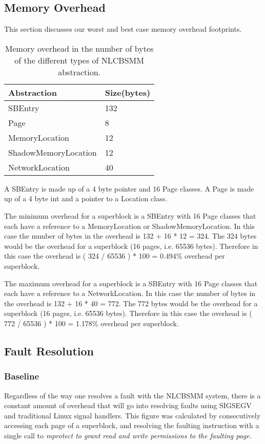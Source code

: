 \documentclass[9pt]{sig-alternate-10pt}
\begin{document}
\subsection{Memory Overhead}
This section discusses our worst and best case memory overhead footprints.

\begin{center}
\begin{table}[htb]
\begin{tabular}{|l | l |}
\hline
\bf{Abstraction} & \bf{Size(bytes)}  \\
\hline
SBEntry &  132\\
Page & 8 \\
MemoryLocation & 12 \\
ShadowMemoryLocation & 12 \\
NetworkLocation & 40 \\
\hline
\end{tabular}
\caption{Memory overhead in the number of bytes of the different types of NLCBSMM abstraction.}
\end{table}
\end{center}

A SBEntry is made up of a 4 byte pointer and 16 Page classes.
A Page is made up of a 4 byte int and a pointer to a Location class.

The minimum overhead for a superblock is a SBEntry with 16 Page classes that each have a reference to a MemoryLocation or ShadowMemoryLocation. In this case the number of bytes in the overhead is 132 + 16 * 12 = 324. The 324 bytes would be the overhead for a superblock (16 pages, i.e. 65536 bytes). Therefore in this case the overhead is ( 324 / 65536 ) * 100 = 0.494\% overhead per superblock.

The maximum overhead for a superblock is a SBEntry with 16 Page classes that each have a reference to a NetworkLocation. In this case the number of bytes in the overhead is 132 + 16 * 40 = 772. The 772 bytes would be the overhead for a superblock (16 pages, i.e. 65536 bytes). Therefore in this case the overhead is ( 772 / 65536 ) * 100 = 1.178\% overhead per superblock.

\subsection{Fault Resolution}
\subsubsection{Baseline}
Regardless of the way one resolves a fault with the NLCBSMM system, there is a constant amount of overhead that will go into resolving faults using SIGSEGV and traditional Linux signal handlers.  This figure was calculated by consecutively accessing each page of a superblock, and resolving the faulting instruction with a single call to \em mprotect \em to grant read and write permissions to the faulting page.
\end{document}
